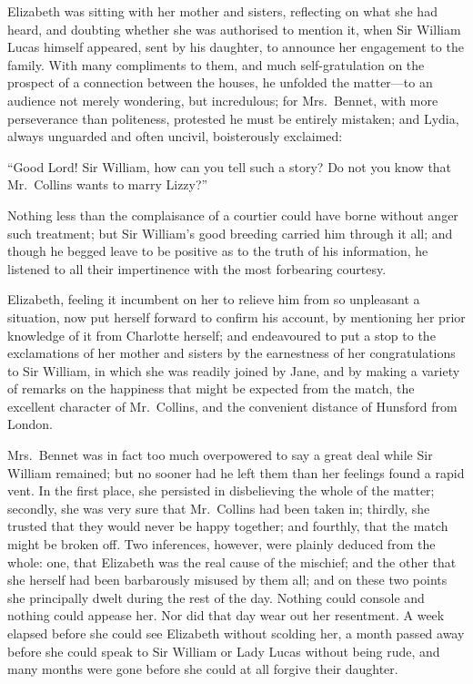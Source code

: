 \documentclass[12pt,english]{book}
\begin{document}


Elizabeth was sitting with her mother and sisters, reflecting on what
she had heard, and doubting whether she was authorised to mention
it, when Sir William Lucas himself appeared, sent by his daughter,
to announce her engagement to the family. With many compliments to
them, and much self-gratulation on the prospect of a connection between
the houses, he unfolded the matter\mbox{---}to an audience not merely
wondering, but incredulous; for Mrs.\ Bennet, with more perseverance
than politeness, protested he must be entirely mistaken; and Lydia,
always unguarded and often uncivil, boisterously exclaimed:

{}``Good Lord! Sir William, how can you tell such a story? Do not
you know that Mr.\ Collins wants to marry Lizzy?''\ 

Nothing less than the complaisance of a courtier could have borne
without anger such treatment; but Sir William's good breeding carried
him through it all; and though he begged leave to be positive as to
the truth of his information, he listened to all their impertinence
with the most forbearing courtesy.

Elizabeth, feeling it incumbent on her to relieve him from so unpleasant
a situation, now put herself forward to confirm his account, by mentioning
her prior knowledge of it from Charlotte herself; and endeavoured
to put a stop to the exclamations of her mother and sisters by the
earnestness of her congratulations to Sir William, in which she was
readily joined by Jane, and by making a variety of remarks on the
happiness that might be expected from the match, the excellent character
of Mr.\ Collins, and the convenient distance of Hunsford from London.

Mrs.\ Bennet was in fact too much overpowered to say a great deal
while Sir William remained; but no sooner had he left them than her
feelings found a rapid vent. In the first place, she persisted in
disbelieving the whole of the matter; secondly, she was very sure
that Mr.\ Collins had been taken in; thirdly, she trusted that they
would never be happy together; and fourthly, that the match might
be broken off. Two inferences, however, were plainly deduced from
the whole: one, that Elizabeth was the real cause of the mischief;
and the other that she herself had been barbarously misused by them
all; and on these two points she principally dwelt during the rest
of the day. Nothing could console and nothing could appease her. Nor
did that day wear out her resentment. A week elapsed before she could
see Elizabeth without scolding her, a month passed away before she
could speak to Sir William or Lady Lucas without being rude, and many
months were gone before she could at all forgive their daughter.
\end{document}
